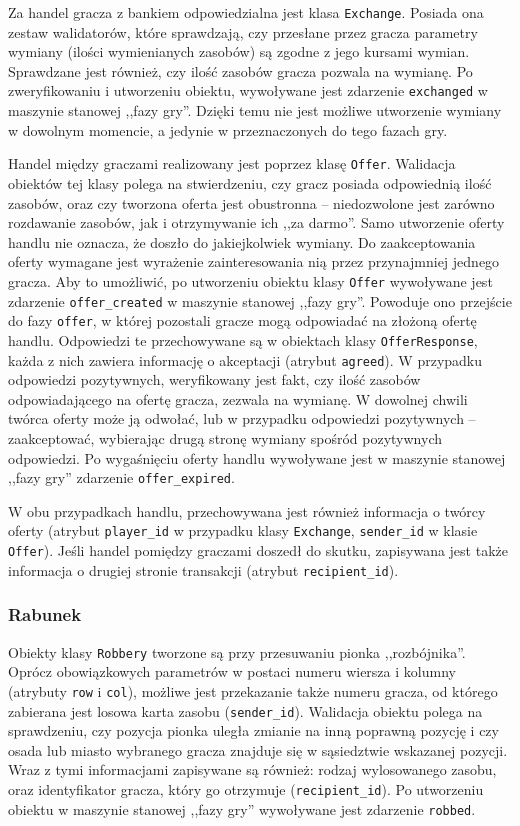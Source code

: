 \documentclass[a4paper,12pt]{article}
\begin{document}
Za handel gracza z bankiem odpowiedzialna jest klasa
\texttt{Exchange}. Posiada ona zestaw walidatorów, które sprawdzają,
czy przesłane przez gracza parametry wymiany (ilości wymienianych
zasobów) są zgodne z jego kursami wymian. Sprawdzane jest również, czy
ilość zasobów gracza pozwala na wymianę. Po zweryfikowaniu i
utworzeniu obiektu, wywoływane jest zdarzenie \texttt{exchanged} w
maszynie stanowej ,,fazy gry''. Dzięki temu nie jest możliwe
utworzenie wymiany w dowolnym momencie, a jedynie w przeznaczonych do
tego fazach gry.

Handel między graczami realizowany jest poprzez klasę
\texttt{Offer}. Walidacja obiektów tej klasy polega na stwierdzeniu,
czy gracz posiada odpowiednią ilość zasobów, oraz czy tworzona oferta
jest obustronna -- niedozwolone jest zarówno rozdawanie zasobów, jak i
otrzymywanie ich ,,za darmo''. Samo utworzenie oferty handlu nie
oznacza, że doszło do jakiejkolwiek wymiany. Do zaakceptowania oferty
wymagane jest wyrażenie zainteresowania nią przez przynajmniej jednego
gracza. Aby to umożliwić, po utworzeniu obiektu klasy \texttt{Offer}
wywoływane jest zdarzenie \texttt{offer\_created} w maszynie stanowej
,,fazy gry''. Powoduje ono przejście do fazy \texttt{offer}, w której
pozostali gracze mogą odpowiadać na złożoną ofertę handlu. Odpowiedzi
te przechowywane są w obiektach klasy \texttt{OfferResponse}, każda z
nich zawiera informację o akceptacji (atrybut \texttt{agreed}). W
przypadku odpowiedzi pozytywnych, weryfikowany jest fakt, czy ilość
zasobów odpowiadającego na ofertę gracza, zezwala na wymianę. W
dowolnej chwili twórca oferty może ją odwołać, lub w przypadku
odpowiedzi pozytywnych -- zaakceptować, wybierając drugą stronę
wymiany spośród pozytywnych odpowiedzi. Po wygaśnięciu oferty handlu
wywoływane jest w maszynie stanowej ,,fazy gry'' zdarzenie
\texttt{offer\_expired}.

W obu przypadkach handlu, przechowywana jest również informacja o
twórcy oferty (atrybut \texttt{player\_id} w przypadku klasy
\texttt{Exchange}, \texttt{sender\_id} w klasie \texttt{Offer}). Jeśli
handel pomiędzy graczami doszedł do skutku, zapisywana jest także
informacja o drugiej stronie transakcji (atrybut
\texttt{recipient\_id}).

\subsubsection{Rabunek}
Obiekty klasy \texttt{Robbery} tworzone są przy przesuwaniu pionka
,,rozbójnika''. Oprócz obowiązkowych parametrów w postaci numeru
wiersza i kolumny (atrybuty \texttt{row} i \texttt{col}), możliwe jest
przekazanie także numeru gracza, od którego zabierana jest losowa
karta zasobu (\texttt{sender\_id}). Walidacja obiektu polega na
sprawdzeniu, czy pozycja pionka uległa zmianie na inną poprawną
pozycję i czy osada lub miasto wybranego gracza znajduje się w
sąsiedztwie wskazanej pozycji. Wraz z tymi informacjami zapisywane są
również: rodzaj wylosowanego zasobu, oraz identyfikator gracza, który
go otrzymuje (\texttt{recipient\_id}). Po utworzeniu obiektu w
maszynie stanowej ,,fazy gry'' wywoływane jest zdarzenie
\texttt{robbed}.
\end{document}
